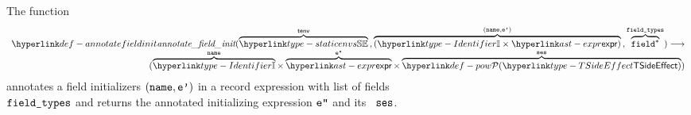 \begin{mathpar}
\end{mathpar}

\hypertarget{def-annotatefieldinit}{}
The function
\[
\begin{array}{r}
  \annotatefieldinit(
    \overname{\staticenvs}{\tenv} \aslsep
    \overname{(\Identifier\times\expr)}{(\name, \vep)} \aslsep
    \overname{\vfield^*}{\fieldtypes}
  ) \aslto \\
  (\overname{\Identifier}{\name} \times \overname{\expr}{\vepp} \times \overname{\TSideEffectSet}{\vses})
\end{array}
\]
annotates a field initializers $(\name, \vep)$ in a record expression
with list of fields \\ $\fieldtypes$ and returns the annotated initializing expression $\vepp$
and its \sideeffectdescriptorterm\ $\vses$.
\ProseOtherwiseTypeError

